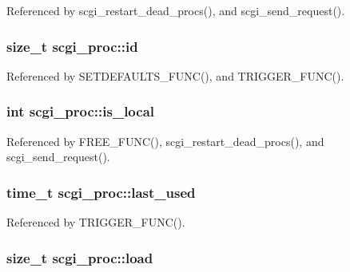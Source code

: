 Referenced by scgi\-\_\-restart\-\_\-dead\-\_\-procs(), and scgi\-\_\-send\-\_\-request().

\hypertarget{structscgi__proc_af7e907a950ab620af3a5b06727adf575}{
\subsubsection[{id}]{\setlength{\rightskip}{0pt plus 5cm}size\-\_\-t scgi\-\_\-proc\-::id}}\label{structscgi__proc_af7e907a950ab620af3a5b06727adf575}


Referenced by S\-E\-T\-D\-E\-F\-A\-U\-L\-T\-S\-\_\-\-F\-U\-N\-C(), and T\-R\-I\-G\-G\-E\-R\-\_\-\-F\-U\-N\-C().

\hypertarget{structscgi__proc_a0bcb2715d253cb39b0ee95a94dd91fa9}{
\subsubsection[{is\-\_\-local}]{\setlength{\rightskip}{0pt plus 5cm}int scgi\-\_\-proc\-::is\-\_\-local}}\label{structscgi__proc_a0bcb2715d253cb39b0ee95a94dd91fa9}


Referenced by F\-R\-E\-E\-\_\-\-F\-U\-N\-C(), scgi\-\_\-restart\-\_\-dead\-\_\-procs(), and scgi\-\_\-send\-\_\-request().

\hypertarget{structscgi__proc_a668a2d7ba5885239e7a53f154ff6d3af}{
\subsubsection[{last\-\_\-used}]{\setlength{\rightskip}{0pt plus 5cm}time\-\_\-t scgi\-\_\-proc\-::last\-\_\-used}}\label{structscgi__proc_a668a2d7ba5885239e7a53f154ff6d3af}


Referenced by T\-R\-I\-G\-G\-E\-R\-\_\-\-F\-U\-N\-C().

\hypertarget{structscgi__proc_a013e0b6ff195b7e6cb1f97c9ffb296fe}{
\subsubsection[{load}]{\setlength{\rightskip}{0pt plus 5cm}size\-\_\-t scgi\-\_\-proc\-::load}}\label{structscgi__proc_a013e0b6ff195b7e6cb1f97c9ffb296fe}


